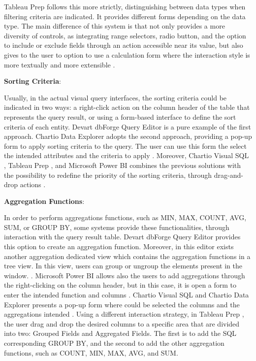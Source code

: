 Tableau Prep \cite{tableauPrep} follows this more strictly, distinguishing between data types when filtering criteria are indicated. It provides different forms depending on the data type. The main difference of this system is that not only provides a more diversity of controls, as integrating range selectors, radio button, and the option to include or exclude fields through an action accessible near its value, but also gives to the user to option to use a calculation form where the interaction style is more textually and more extensible \cite{tableauFilterYourData}.

\textbf{Sorting Criteria}: 

Usually, in the actual visual query interfaces, the sorting criteria could be indicated in two ways: a right-click action on the column header of the table that represents the query result, or using a form-based interface to define the sort criteria of each entity. Devart dbForge Query Editor \cite{dbForgeQueryBuilder} is a pure example of the first approach. \cite{dbForgeSortingData} Chartio Data Explorer \cite{chartioDataExplorer} adopts the second approach, providing a pop-up form to apply sorting criteria to the query. The user can use this form the select the intended attributes and the criteria to apply \cite{chartioAdvancedSorting}. Moreover, Chartio Visual SQL \cite{chartioVisualSQL}, Tableau Prep \cite{tableauPrep}, and Microsoft Power BI \cite{powerBI} combines the previous solutions with the possibility to redefine the priority of the sorting criteria, through drag-and-drop actions \cite{visualSqlActions} \cite{tableauSortData} \cite{powerBIShapeAndCombineData}.

\textbf{Aggregation Functions}: 

In order to perform aggregations functions, such as MIN, MAX, COUNT, AVG, SUM, or GROUP BY, some systems provide these functionalities, through interaction with the query result table. Devart dbForge Query Editor \cite{dbForgeQueryBuilder} provides this option to create an aggregation function. Moreover, in this editor exists another aggregation dedicated view which contains the aggregation functions in a tree view. In this view, users can group or ungroup the elements present in the window. \cite{dbForgeGroupingDataInGrid}. Microsoft Power BI \cite{powerBI} allows also the users to add aggregations through the right-clicking on the column header, but in this case, it is open a form to enter the intended function and columns \cite{powerBICommonQueryTasks}. Chartio Visual SQL \cite{chartioVisualSQL} and Chartio Data Explorer \cite{chartioDataExplorer} presents a pop-up form where could be selected the columns and the aggregations intended \cite{chartioDataPipelineSteps}. Using a different interaction strategy, in Tableau Prep \cite{tableauPrep}, the user drag and drop the desired columns to a specific area that are divided into two: Grouped Fields and Aggregated Fields. The first is to add the SQL corresponding GROUP BY, and the second to add the other aggregation functions, such as COUNT, MIN, MAX, AVG, and SUM.

